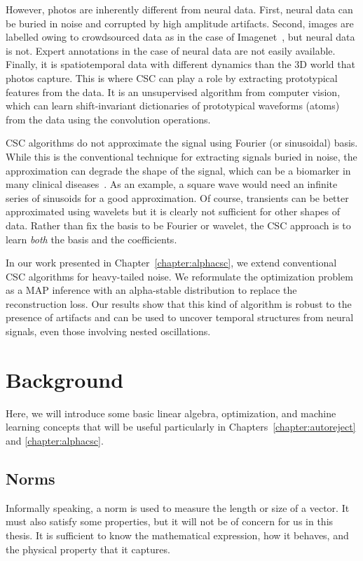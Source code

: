 However, photos are inherently different from neural data. First, neural data can be buried in noise and corrupted by high amplitude artifacts. Second, images are labelled owing to crowdsourced data as in the case of  Imagenet~\citep{deng2009imagenet}, but neural data is not. 
Expert annotations in the case of neural data are not easily available.
Finally, it is spatiotemporal data with different dynamics than the 3D world that photos capture. This is where \ac{CSC} can play a role by extracting prototypical features from the data. It is an unsupervised algorithm from computer vision, which can learn shift-invariant dictionaries of prototypical waveforms (atoms) from the data using the convolution operations.

\ac{CSC} algorithms do not approximate the signal using Fourier (or sinusoidal) basis. While this is the conventional technique for extracting signals buried in noise, the approximation can degrade the shape of the signal, which can be a biomarker in many clinical diseases~\citep{cole2017brain}. As an example, a square wave would need an infinite series of sinusoids for a good approximation. Of course, transients can be better approximated using wavelets but it is clearly not sufficient for other shapes of data. Rather than fix the basis to be Fourier or wavelet, the \ac{CSC} approach is to learn \emph{both} the basis and the coefficients.

In our work presented in Chapter~\ref{chapter:alphacsc}, we extend conventional \ac{CSC} algorithms for heavy-tailed noise. We reformulate the optimization problem as a \ac{MAP} inference with an alpha-stable distribution to replace the reconstruction loss. Our results show that this kind of algorithm is robust to the presence of artifacts and can be used to uncover temporal structures from neural signals, even those involving nested oscillations.

\clearpage
\section{Background}

Here, we will introduce some basic linear algebra, optimization, and machine learning concepts that will be useful particularly in Chapters~\ref{chapter:autoreject} and \ref{chapter:alphacsc}.

\subsection{Norms}
Informally speaking, a norm is used to measure the length or size of a vector. It must also satisfy some properties, but it will not be of concern for us in this thesis. It is sufficient to know the mathematical expression, how it behaves, and the physical property that it captures.
\theoremstyle{definition}
\newtheorem{definition}{Definition}[chapter]

